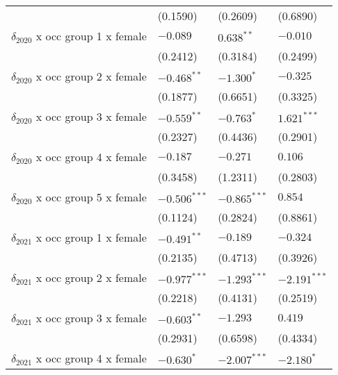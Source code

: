 \begin{tabular}{llll}
                                         &           (0.1590) &           (0.2609) &           (0.6890) \\
$\delta_{2020}$ x occ group 1 x female   &           $-0.089$ &       $0.638^{**}$ &           $-0.010$ \\
                                         &           (0.2412) &           (0.3184) &           (0.2499) \\
$\delta_{2020}$ x occ group 2 x female   &      $-0.468^{**}$ &         $-1.300^*$ &           $-0.325$ \\
                                         &           (0.1877) &           (0.6651) &           (0.3325) \\
$\delta_{2020}$ x occ group 3 x female   &      $-0.559^{**}$ &         $-0.763^*$ &      $1.621^{***}$ \\
                                         &           (0.2327) &           (0.4436) &           (0.2901) \\
$\delta_{2020}$ x occ group 4 x female   &           $-0.187$ &           $-0.271$ &            $0.106$ \\
                                         &           (0.3458) &           (1.2311) &           (0.2803) \\
$\delta_{2020}$ x occ group 5 x female   &     $-0.506^{***}$ &     $-0.865^{***}$ &            $0.854$ \\
                                         &           (0.1124) &           (0.2824) &           (0.8861) \\
$\delta_{2021}$ x occ group 1 x female   &      $-0.491^{**}$ &           $-0.189$ &           $-0.324$ \\
                                         &           (0.2135) &           (0.4713) &           (0.3926) \\
$\delta_{2021}$ x occ group 2 x female   &     $-0.977^{***}$ &     $-1.293^{***}$ &     $-2.191^{***}$ \\
                                         &           (0.2218) &           (0.4131) &           (0.2519) \\
$\delta_{2021}$ x occ group 3 x female   &      $-0.603^{**}$ &           $-1.293$ &            $0.419$ \\
                                         &           (0.2931) &           (0.6598) &           (0.4334) \\
$\delta_{2021}$ x occ group 4 x female   &         $-0.630^*$ &     $-2.007^{***}$ &         $-2.180^*$ \\

\end{tabular}

